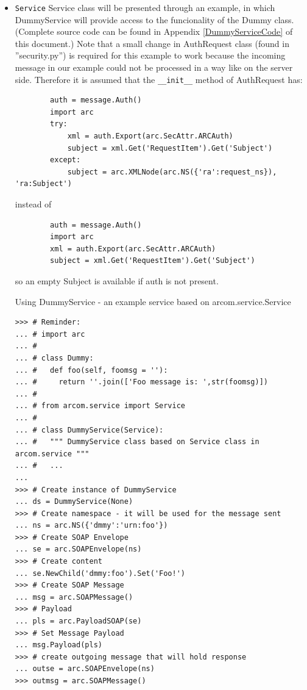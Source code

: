 \documentclass{article}
\begin{document}
\begin{flushleft}
\begin{itemize}
  \item{ \verb$Service$ \linebreak
  Service class will be presented through an example, in which DummyService will provide
  access to the funcionality of the Dummy class. (Complete source code can be found in Appendix 
  \ref{DummyServiceCode} of this document.)\linebreak
  Note that a small change in AuthRequest class (found in ''security.py'') is required for 
  this example to work because the incoming message in our example could not be processed
  in a way like on the server side. Therefore it is assumed that the \verb$__init__$ method
  of AuthRequest has:
\begin{verbatim}
        auth = message.Auth()
        import arc
        try:
            xml = auth.Export(arc.SecAttr.ARCAuth)
            subject = xml.Get('RequestItem').Get('Subject')
        except:
            subject = arc.XMLNode(arc.NS({'ra':request_ns}), 'ra:Subject')
\end{verbatim}
  instead of \linebreak
\begin{verbatim}
        auth = message.Auth()
        import arc
        xml = auth.Export(arc.SecAttr.ARCAuth)
        subject = xml.Get('RequestItem').Get('Subject')
\end{verbatim}
  so an empty Subject is available if auth is not present.
    \begin{example}
      \caption{Using DummyService - an example service based on arcom.service.Service}\label{srvex}
\begin{verbatim}
>>> # Reminder:
... # import arc
... #
... # class Dummy:
... #   def foo(self, foomsg = ''):
... #     return ''.join(['Foo message is: ',str(foomsg)])
... # 
... # from arcom.service import Service
... # 
... # class DummyService(Service):
... #   """ DummyService class based on Service class in arcom.service """
... #   ...
... 
>>> # Create instance of DummyService
... ds = DummyService(None)
>>> # Create namespace - it will be used for the message sent
... ns = arc.NS({'dmmy':'urn:foo'})
>>> # Create SOAP Envelope
... se = arc.SOAPEnvelope(ns)
>>> # Create content
... se.NewChild('dmmy:foo').Set('Foo!')
>>> # Create SOAP Message
... msg = arc.SOAPMessage()
>>> # Payload
... pls = arc.PayloadSOAP(se)
>>> # Set Message Payload
... msg.Payload(pls)
>>> # create outgoing message that will hold response
... outse = arc.SOAPEnvelope(ns)
>>> outmsg = arc.SOAPMessage()

\end{verbatim}
\end{example}}
\end{itemize}
\end{flushleft}
\end{document}

